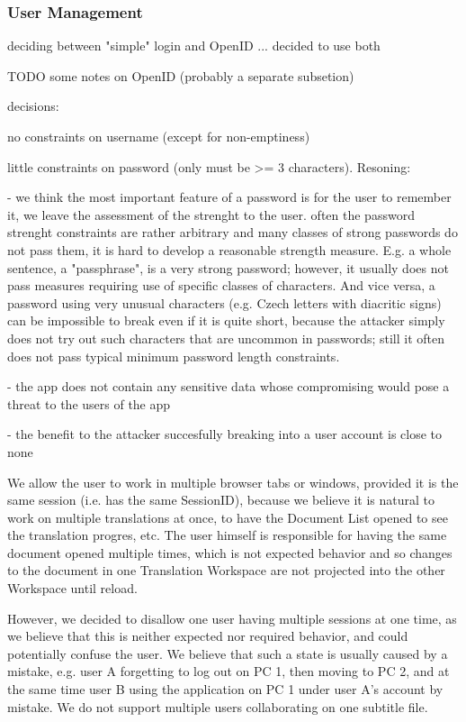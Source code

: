 \subsubsection{User Management}

deciding between "simple" login and OpenID ... decided to use both

TODO some notes on OpenID (probably a separate subsetion)

decisions:

no constraints on username (except for non-emptiness)

little constraints on password (only must be >= 3 characters). Resoning:

- we think the most important feature of a password is for the user to remember it, we leave the assessment of the strenght to the user.
often the password strenght constraints are rather arbitrary and many classes of strong passwords do not pass them, it is hard to develop a reasonable strength measure. E.g. a whole sentence, a "passphrase", is a very strong password; however, it usually does not pass measures requiring use of specific classes of characters. And vice versa, a password using very unusual characters (e.g. Czech letters with diacritic signs) can be impossible to break even if it is quite short, because the attacker simply does not try out such characters that are uncommon in passwords; still it often does not pass typical minimum password length constraints.

- the app does not contain any sensitive data whose compromising would pose a threat to the users of the app

- the benefit to the attacker succesfully breaking into a user account is close to none


We allow the user to work in multiple browser tabs or windows, provided it is the same session (i.e. has the same SessionID), because we believe it is natural to work on multiple translations at once, to have the Document List opened to see the translation progres, etc. The user himself is responsible for having the same document opened multiple times, which is not expected behavior and so changes to the document in one Translation Workspace are not projected into the other Workspace until reload.

However, we decided to disallow one user having multiple sessions at one time, as we believe that this is neither expected nor required behavior, and could potentially confuse the user. We believe that such a state is usually caused by a mistake, e.g. user A forgetting to log out on PC 1, then moving to PC 2, and at the same time user B using the application on PC 1 under user A's account by mistake.
We do not support multiple users collaborating on one subtitle file.

